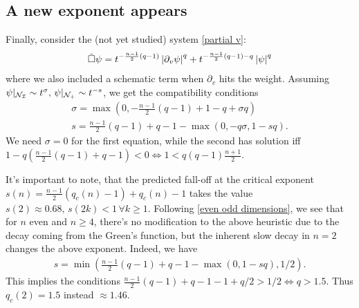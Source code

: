 \documentclass[11pt, oneside]{amsart}
\begin{document}
	\subsection{A new exponent appears}
	Finally, consider the (not yet studied) system \cref{partial v}:
	\begin{equation*}
		\begin{gathered}
			\tilde{\Box}\psi=t^{-\frac{n-1}{2}(q-1)}\left\lvert \partial_v\psi\right\rvert^q+t^{-\frac{n-1}{2}(q-1)-q}\left\lvert \psi\right\rvert^q
		\end{gathered}
	\end{equation*}
	where we also included a schematic term when $\partial_v$ hits the weight. Assuming $\psi|_{\mathcal{N}_{\mathcal{I}}}\sim t^{\sigma},\,\psi|_{\mathcal{N}_+}\sim t^{-s}$, we get the compatibility conditions
	\begin{equation*}
		\begin{gathered}
			\sigma=\max(0,-\frac{n-1}{2}(q-1)+1-q+\sigma q)\\
			s=\frac{n-1}{2}(q-1)+q-1-\max(0,-q\sigma,1-sq).
		\end{gathered}
	\end{equation*}
	We need $\sigma=0$ for the first equation, while the second has solution iff $1-q(\frac{n-1}{2}(q-1)+q-1)<0\iff1<q(q-1)\frac{n+1}{2}$. 
	
	\begin{remark}\label{importance of dimension in even case}
		It's important to note, that the predicted fall-off at the critical exponent $s(n)=\frac{n-1}{2}(q_c(n)-1)+q_c(n)-1$ takes the value $s(2)\approx0.68,\, s(2k)<1\,\forall k\geq1$. Following \cref{even odd dimensions}, we see that for $n$ even and $n\geq4$, there's no modification to the above heuristic due to the decay coming from the Green's function, but the inherent slow decay in $n=2$ changes the above exponent. Indeed, we have
		\begin{equation*}
			\begin{gathered}
				s=\min(\frac{n-1}{2}(q-1)+q-1-\max(0,1-sq),1/2).
			\end{gathered}
		\end{equation*}
		This implies the conditions $\frac{n-1}{2}(q-1)+q-1-1+q/2>1/2\iff q>1.5$. Thus $q_c(2)=1.5$ instead $\approx1.46$.
	\end{remark}
	
	
\end{document}
